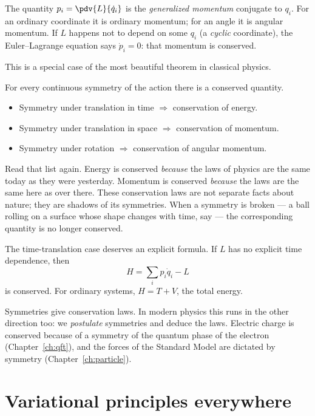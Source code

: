 The quantity $p_i = \pdv{L}{\dot q_i}$ is the \emph{generalized momentum} conjugate to $q_i$. For an ordinary coordinate it is ordinary momentum; for an angle it is angular momentum. If $L$ happens not to depend on some $q_i$ (a \emph{cyclic} coordinate), the Euler--Lagrange equation says $\dot p_i = 0$: that momentum is conserved.

This is a special case of the most beautiful theorem in classical physics.

\begin{theorem}
For every continuous symmetry of the action there is a conserved quantity.
\begin{itemize}[itemsep=2pt]
  \item Symmetry under translation in time $\Longrightarrow$ conservation of energy.
  \item Symmetry under translation in space $\Longrightarrow$ conservation of momentum.
  \item Symmetry under rotation $\Longrightarrow$ conservation of angular momentum.
\end{itemize}
\end{theorem}

Read that list again. Energy is conserved \emph{because} the laws of physics are the same today as they were yesterday. Momentum is conserved \emph{because} the laws are the same here as over there. These conservation laws are not separate facts about nature; they are shadows of its symmetries. When a symmetry is broken --- a ball rolling on a surface whose shape changes with time, say --- the corresponding quantity is no longer conserved.

The time-translation case deserves an explicit formula. If $L$ has no explicit time dependence, then
\[
  H = \sum_i p_i\dot q_i - L
\]
is conserved. For ordinary systems, $H = T+V$, the total energy.

\begin{keyidea}
Symmetries give conservation laws. In modern physics this runs in the other direction too: we \emph{postulate} symmetries and deduce the laws. Electric charge is conserved because of a symmetry of the quantum phase of the electron (Chapter~\ref{ch:qft}), and the forces of the Standard Model are dictated by symmetry (Chapter~\ref{ch:particle}).
\end{keyidea}

\section{Variational principles everywhere}

